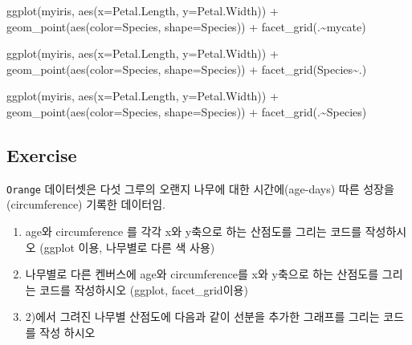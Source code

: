 \documentclass[
]{book}
\newenvironment{Shaded}{\begin{snugshade}}{\end{snugshade}}
\newcommand{\AttributeTok}[1]{\textcolor[rgb]{0.77,0.63,0.00}{#1}}
\newcommand{\FunctionTok}[1]{\textcolor[rgb]{0.00,0.00,0.00}{#1}}
\newcommand{\NormalTok}[1]{#1}
\newcommand{\SpecialCharTok}[1]{\textcolor[rgb]{0.00,0.00,0.00}{#1}}
\begin{document}
\begin{Shaded}
\begin{Highlighting}[]
\FunctionTok{ggplot}\NormalTok{(myiris, }\FunctionTok{aes}\NormalTok{(}\AttributeTok{x=}\NormalTok{Petal.Length, }\AttributeTok{y=}\NormalTok{Petal.Width)) }\SpecialCharTok{+} 
  \FunctionTok{geom\_point}\NormalTok{(}\FunctionTok{aes}\NormalTok{(}\AttributeTok{color=}\NormalTok{Species, }\AttributeTok{shape=}\NormalTok{Species)) }\SpecialCharTok{+}
  \FunctionTok{facet\_grid}\NormalTok{(.}\SpecialCharTok{\textasciitilde{}}\NormalTok{mycate)}

\FunctionTok{ggplot}\NormalTok{(myiris, }\FunctionTok{aes}\NormalTok{(}\AttributeTok{x=}\NormalTok{Petal.Length, }\AttributeTok{y=}\NormalTok{Petal.Width)) }\SpecialCharTok{+} 
  \FunctionTok{geom\_point}\NormalTok{(}\FunctionTok{aes}\NormalTok{(}\AttributeTok{color=}\NormalTok{Species, }\AttributeTok{shape=}\NormalTok{Species)) }\SpecialCharTok{+}
  \FunctionTok{facet\_grid}\NormalTok{(Species}\SpecialCharTok{\textasciitilde{}}\NormalTok{.)}

\FunctionTok{ggplot}\NormalTok{(myiris, }\FunctionTok{aes}\NormalTok{(}\AttributeTok{x=}\NormalTok{Petal.Length, }\AttributeTok{y=}\NormalTok{Petal.Width)) }\SpecialCharTok{+} 
  \FunctionTok{geom\_point}\NormalTok{(}\FunctionTok{aes}\NormalTok{(}\AttributeTok{color=}\NormalTok{Species, }\AttributeTok{shape=}\NormalTok{Species)) }\SpecialCharTok{+}
  \FunctionTok{facet\_grid}\NormalTok{(.}\SpecialCharTok{\textasciitilde{}}\NormalTok{Species)}
\end{Highlighting}
\end{Shaded}

\hypertarget{ex10.1}{%
\subsection{Exercise}\label{ex10.1}}

\texttt{Orange} 데이터셋은 다섯 그루의 오랜지 나무에 대한 시간에(age-days) 따른 성장을(circumference) 기록한 데이터임.

\begin{enumerate}
\def\labelenumi{\arabic{enumi})}
\item
  age와 circumference 를 각각 x와 y축으로 하는 산점도를 그리는 코드를 작성하시오 (ggplot 이용, 나무별로 다른 색 사용)
\item
  나무별로 다른 켄버스에 age와 circumference를 x와 y축으로 하는 산점도를 그리는 코드를 작성하시오 (ggplot, facet\_grid이용)
\item
  2)에서 그려진 나무별 산점도에 다음과 같이 선분을 추가한 그래프를 그리는 코드를 작성 하시오
\end{enumerate}
\end{document}
